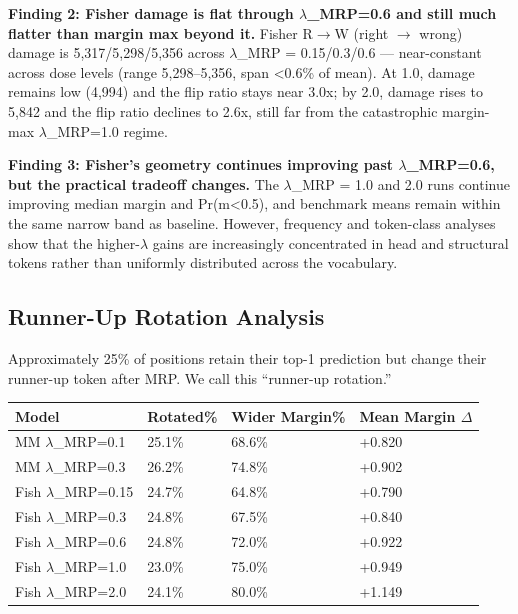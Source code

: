 \documentclass[
  11pt,
]{article}
\begin{document}
\textbf{Finding 2: Fisher damage is flat through $\lambda$\_MRP=0.6 and still
much flatter than margin max beyond it.} Fisher R$\rightarrow$W (right $\rightarrow$ wrong)
damage is 5,317/5,298/5,356 across $\lambda$\_MRP = 0.15/0.3/0.6 ---
near-constant across dose levels (range 5,298--5,356, span
\textless0.6\% of mean). At 1.0, damage remains low (4,994) and the flip
ratio stays near 3.0x; by 2.0, damage rises to 5,842 and the flip ratio
declines to 2.6x, still far from the catastrophic margin-max $\lambda$\_MRP=1.0
regime.

\textbf{Finding 3: Fisher's geometry continues improving past
$\lambda$\_MRP=0.6, but the practical tradeoff changes.} The $\lambda$\_MRP = 1.0 and
2.0 runs continue improving median margin and Pr(m\textless0.5), and
benchmark means remain within the same narrow band as baseline. However,
frequency and token-class analyses show that the higher-$\lambda$ gains are
increasingly concentrated in head and structural tokens rather than
uniformly distributed across the vocabulary.

\hypertarget{runner-up-rotation-analysis}{%
\subsection{Runner-Up Rotation
Analysis}\label{runner-up-rotation-analysis}}

Approximately 25\% of positions retain their top-1 prediction but change
their runner-up token after MRP. We call this ``runner-up rotation.''

\begin{longtable}[]{@{}llll@{}}
\toprule\noalign{}
Model & Rotated\% & Wider Margin\% & Mean Margin $\Delta$ \\
\midrule\noalign{}
\endhead
\bottomrule\noalign{}
\endlastfoot
MM $\lambda$\_MRP=0.1 & 25.1\% & 68.6\% & +0.820 \\
MM $\lambda$\_MRP=0.3 & 26.2\% & 74.8\% & +0.902 \\
Fish $\lambda$\_MRP=0.15 & 24.7\% & 64.8\% & +0.790 \\
Fish $\lambda$\_MRP=0.3 & 24.8\% & 67.5\% & +0.840 \\
Fish $\lambda$\_MRP=0.6 & 24.8\% & 72.0\% & +0.922 \\
Fish $\lambda$\_MRP=1.0 & 23.0\% & 75.0\% & +0.949 \\
Fish $\lambda$\_MRP=2.0 & 24.1\% & 80.0\% & +1.149 \\
\end{longtable}
\end{document}

